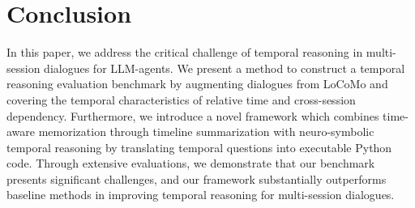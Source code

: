 \section{Conclusion}
In this paper, we address the critical challenge of temporal reasoning in multi-session dialogues for LLM-agents. We present a method to construct a temporal reasoning evaluation benchmark by augmenting dialogues from LoCoMo and covering the temporal characteristics of relative time and cross-session dependency. Furthermore, we introduce a novel framework which combines time-aware memorization through timeline summarization with neuro-symbolic temporal reasoning by translating temporal questions into executable Python code. 
Through extensive evaluations, we demonstrate that our benchmark presents significant challenges, and our framework substantially outperforms baseline methods in improving temporal reasoning for multi-session dialogues.
